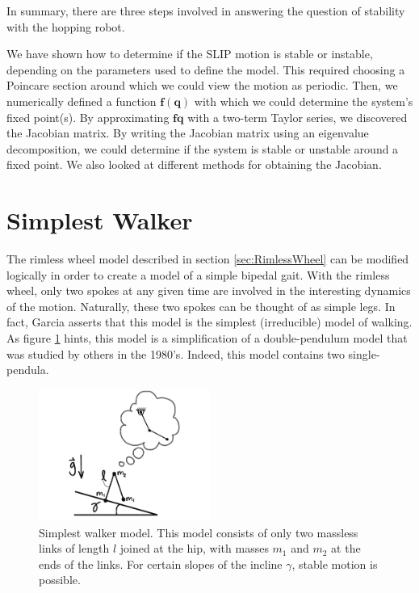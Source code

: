 
In summary, there are three steps involved in answering the question of
stability with the hopping robot.

We have shown how to determine if the SLIP motion is stable or instable,
depending on the parameters used to define the model. This required choosing a
Poincare section around which we could view the motion as periodic. Then, we
numerically defined a function $\mathbf{f}(\mathbf{q})$ with which we could
determine the system's fixed point(s). By approximating
$\mathbf{f}{\mathbf{q}}$ with a two-term Taylor series, we discovered the
Jacobian matrix. By writing the Jacobian matrix using an eigenvalue
decomposition, we could determine if the system is stable or unstable around a
fixed point. We also looked at different methods for obtaining the Jacobian.


\section{Simplest Walker} %
\label{sec:SimplestWalker}



The rimless wheel model described in section \ref{sec:RimlessWheel} can be modified logically in order to create a model of a simple bipedal gait. With the rimless wheel, only two spokes at any given time are involved in the interesting dynamics of the motion. Naturally, these two spokes can be thought of as simple legs. In fact, Garcia \cite{garcia97} asserts that this model is the simplest (irreducible) model of walking. As figure \ref{fig:SimplestWalkerPendulum} hints, this model is a simplification of a double-pendulum model that was studied by 
others in the 1980's. Indeed, this model contains two single-pendula.

\begin{figure}[h]		%
\begin{centering}
\includegraphics[width=0.5\textwidth]{Figures/SimplestWalkerPendulum}\par
\end{centering}
\caption[Diagram: Simplest Walker Model]{Simplest walker model. This model consists of only two massless links of length $l$ joined at the hip, with masses $m_{1}$ and $m_{2}$ at the ends of the links. For certain slopes of the incline $\gamma$, stable motion is possible.}
\label{fig:SimplestWalkerPendulum}
\end{figure}
%

